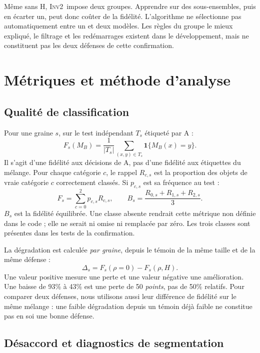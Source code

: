 \documentclass[11pt,a4paper]{article}
\newcommand{\ind}{\mathbf{1}}
\newcommand{\Inv}{\textsc{Inv2}}
\begin{document}
Même sans H, \Inv\ impose deux groupes. Apprendre sur des sous-ensembles,
puis en écarter un, peut donc coûter de la fidélité. L'algorithme ne sélectionne
pas automatiquement entre un et deux modèles. Les règles du groupe le mieux
expliqué, le filtrage et les redémarrages existent dans le développement, mais
ne constituent pas les deux défenses de cette confirmation.

\section{Métriques et méthode d'analyse}
\subsection{Qualité de classification}

Pour une graine $s$, sur le test indépendant $T_s$ étiqueté par A :
\begin{equation}
 F_s(M_B)=\frac{1}{|T_s|}\sum_{(x,y)\in T_s}\ind\{M_B(x)=y\}.
 \label{eq:fidelite}
\end{equation}
Il s'agit d'une fidélité aux décisions de A, pas d'une fidélité aux étiquettes
du mélange. Pour chaque catégorie $c$, le rappel $R_{c,s}$ est la proportion
des objets de vraie catégorie $c$ correctement classés. Si $p_{c,s}$ est sa
fréquence au test :
\begin{equation}
 F_s=\sum_{c=0}^{2}p_{c,s}R_{c,s},\qquad
 B_s=\frac{R_{0,s}+R_{1,s}+R_{2,s}}{3}.
 \label{eq:equilibree}
\end{equation}
$B_s$ est la fidélité équilibrée. Une classe absente rendrait cette métrique
non définie dans le code ; elle ne serait ni omise ni remplacée par zéro. Les
trois classes sont présentes dans les tests de la confirmation.

La dégradation est calculée \emph{par graine}, depuis le témoin de la même
taille et de la même défense :
\[
 \Delta_s=F_s(\rho=0)-F_s(\rho,H).
\]
Une valeur positive mesure une perte et une valeur négative une amélioration.
Une baisse de 93\% à 43\% est une perte de 50 \emph{points}, pas de 50\% relatifs.
Pour comparer deux défenses, nous utilisons aussi leur différence de fidélité
sur le même mélange : une faible dégradation depuis un témoin déjà faible ne
constitue pas en soi une bonne défense.

\subsection{Désaccord et diagnostics de segmentation}
\end{document}
